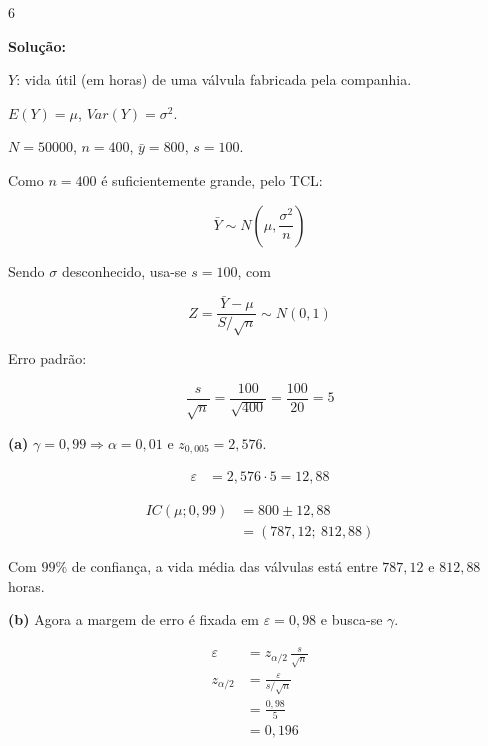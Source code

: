 \documentclass[8pt, a4paper, landscape]{extarticle}
\begin{document}
\begin{multicols}{6}
\vspace{0.3cm}

\textbf{Solução:}

$Y$: vida útil (em horas) de uma válvula fabricada pela companhia.

$E(Y) = \mu$, \quad $Var(Y) = \sigma^2$.

$N = 50000$, \quad $n = 400$, \quad $\bar{y} = 800$, \quad $s = 100$.

Como $n = 400$ é suficientemente grande, pelo TCL:

\begin{equation*}
\bar{Y} \sim N\left(\mu, \frac{\sigma^2}{n}\right)
\end{equation*}

Sendo $\sigma$ desconhecido, usa-se $s = 100$, com

\begin{equation*}
Z = \frac{\bar{Y} - \mu}{S/\sqrt{n}} \sim N(0,1)
\end{equation*}

Erro padrão:

\begin{equation*}
\frac{s}{\sqrt{n}} = \frac{100}{\sqrt{400}} = \frac{100}{20} = 5
\end{equation*}

\vspace{0.2cm}

\textbf{(a)} $\gamma = 0,99 \Rightarrow \alpha = 0,01$ e $z_{0,005} = 2,576$.

\begin{equation*}
\begin{split}
\varepsilon &= 2,576 \cdot 5 = 12,88
\end{split}
\end{equation*}

\begin{equation*}
\begin{split}
IC(\mu;0,99) &= 800 \pm 12,88 \\
&= (787,12;\ 812,88)
\end{split}
\end{equation*}

Com $99\%$ de confiança, a vida média das válvulas está entre $787,12$ e $812,88$ horas.

\vspace{0.2cm}

\textbf{(b)} Agora a margem de erro é fixada em $\varepsilon = 0,98$ e busca-se $\gamma$.

\begin{equation*}
\begin{split}
\varepsilon &= z_{\alpha/2}\,\frac{s}{\sqrt{n}} \\
z_{\alpha/2} &= \frac{\varepsilon}{s/\sqrt{n}} \\
&= \frac{0,98}{5} \\
&= 0,196
\end{split}
\end{equation*}


\end{multicols}
\end{document}

